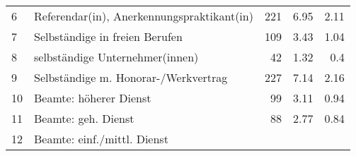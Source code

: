 \begin{longtable}{lXrrr}
     6 &
     \multicolumn{1}{X}{ Referendar(in), Anerkennungspraktikant(in)   } &


       \num{221} &
       \num[round-mode=places,round-precision=2]{6,95} &
         \num[round-mode=places,round-precision=2]{2,11} \\

     7 &
     \multicolumn{1}{X}{ Selbständige in freien Berufen   } &


       \num{109} &
       \num[round-mode=places,round-precision=2]{3,43} &
         \num[round-mode=places,round-precision=2]{1,04} \\

     8 &
     \multicolumn{1}{X}{ selbständige Unternehmer(innen)   } &


       \num{42} &
       \num[round-mode=places,round-precision=2]{1,32} &
         \num[round-mode=places,round-precision=2]{0,4} \\

     9 &
     \multicolumn{1}{X}{ Selbständige m. Honorar-/Werkvertrag   } &


       \num{227} &
       \num[round-mode=places,round-precision=2]{7,14} &
         \num[round-mode=places,round-precision=2]{2,16} \\

     10 &
     \multicolumn{1}{X}{ Beamte: höherer Dienst   } &


       \num{99} &
       \num[round-mode=places,round-precision=2]{3,11} &
         \num[round-mode=places,round-precision=2]{0,94} \\

     11 &
     \multicolumn{1}{X}{ Beamte: geh. Dienst   } &


       \num{88} &
       \num[round-mode=places,round-precision=2]{2,77} &
         \num[round-mode=places,round-precision=2]{0,84} \\

     12 &
     \multicolumn{1}{X}{ Beamte: einf./mittl. Dienst   } &



\end{longtable}
